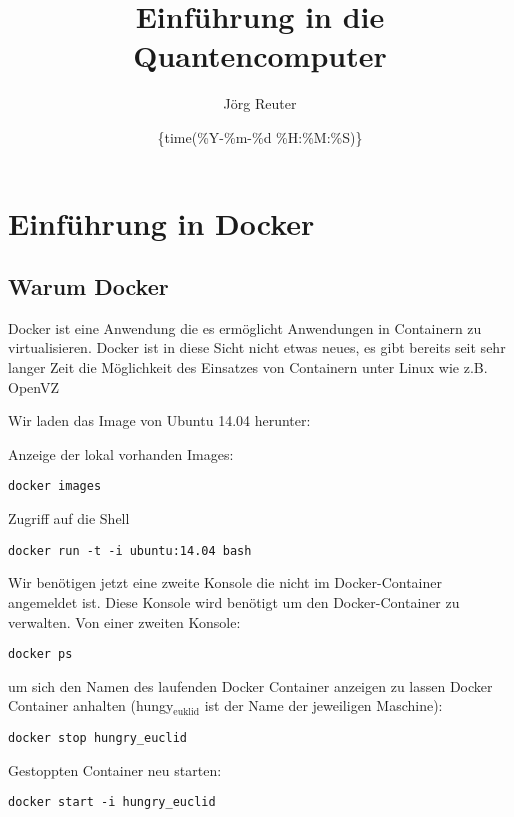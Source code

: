 \documentclass[11pt]{article}
\author{Jörg Reuter}
\date{\{time(\%Y-\%m-\%d \%H:\%M:\%S)\}}
\title{Einführung in die Quantencomputer}
\begin{document}
\maketitle
\tableofcontents


\section*{Einführung in Docker}
\label{sec-1}
\subsection*{Warum Docker}
\label{sec-1-1}
Docker ist eine Anwendung die es ermöglicht Anwendungen in Containern zu virtualisieren. Docker ist in diese Sicht nicht etwas neues, es gibt bereits seit sehr langer Zeit die Möglichkeit des Einsatzes von Containern unter Linux wie z.B. OpenVZ



Wir laden das Image von Ubuntu 14.04 herunter:

Anzeige der lokal vorhanden Images:

\label{local_Images}
\begin{verbatim}
docker images
\end{verbatim}

Zugriff auf die Shell

\label{dockerrun}
\begin{verbatim}
docker run -t -i ubuntu:14.04 bash
\end{verbatim}

Wir benötigen jetzt eine zweite Konsole die nicht im Docker-Container angemeldet ist. Diese Konsole wird benötigt um den Docker-Container zu verwalten.
Von einer zweiten Konsole:
\label{dockerps}
\begin{verbatim}
docker ps
\end{verbatim}

um sich den Namen des laufenden Docker Container anzeigen zu lassen 
Docker Container anhalten (hungy$_{\text{euklid}}$ ist der Name der jeweiligen Maschine):

\label{docker-stop}
\begin{verbatim}
docker stop hungry_euclid
\end{verbatim}

Gestoppten Container neu starten:

\label{dockerstart}
\begin{verbatim}
docker start -i hungry_euclid
\end{verbatim}
\end{document}
